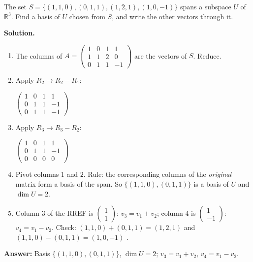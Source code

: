 \documentclass[11pt]{article}
\begin{document}
\begin{tcolorbox}[breakable,colback=white,colframe=ink!60,title={\bfseries Example 4 \textperiodcentered\ Extracting a basis from a spanning set}]The set $S=\{(1,1,0),(0,1,1),(1,2,1),(1,0,-1)\}$ spans a subspace $U$ of $\mathbb{R}^{3}$. Find a basis of $U$ chosen from $S$, and write the other vectors through it.
\par\smallskip
\textbf{Solution.} \begin{enumerate}[leftmargin=1.6em,itemsep=1pt,topsep=2pt,label=\arabic*.]\item The columns of $A=\begin{pmatrix}1 & 0 & 1 & 1 \\ 1 & 1 & 2 & 0 \\ 0 & 1 & 1 & -1\end{pmatrix}$ are the vectors of $S$. Reduce.
\item Apply $R_2\to R_2-R_1$:\par\smallskip $\displaystyle \begin{pmatrix}1 & 0 & 1 & 1 \\ 0 & 1 & 1 & -1 \\ 0 & 1 & 1 & -1\end{pmatrix}$
\item Apply $R_3\to R_3-R_2$:\par\smallskip $\displaystyle \begin{pmatrix}1 & 0 & 1 & 1 \\ 0 & 1 & 1 & -1 \\ 0 & 0 & 0 & 0\end{pmatrix}$
\item Pivot columns $1$ and $2$. Rule: the corresponding columns of the \emph{original} matrix form a basis of the span. So $\{(1,1,0),(0,1,1)\}$ is a basis of $U$ and $\dim U=2$.
\item Column $3$ of the RREF is $\begin{pmatrix}1\\1\end{pmatrix}$: $v_3=v_1+v_2$; column $4$ is $\begin{pmatrix}1\\-1\end{pmatrix}$: $v_4=v_1-v_2$. Check: $(1,1,0)+(0,1,1)=(1,2,1)$ \checkmark and $(1,1,0)-(0,1,1)=(1,0,-1)$ \checkmark.
\end{enumerate}\textbf{Answer:} Basis $\{(1,1,0),(0,1,1)\}$, $\dim U=2$; $v_3=v_1+v_2$, $v_4=v_1-v_2$.
\end{tcolorbox}
\end{document}

